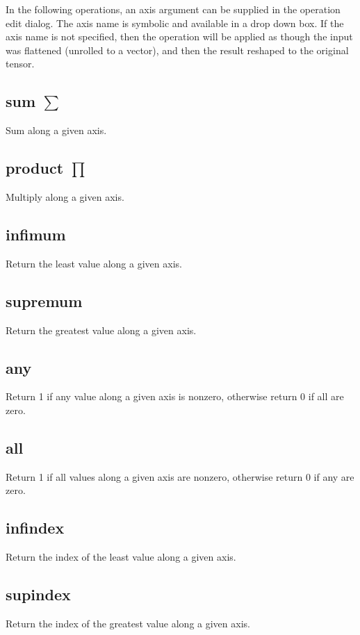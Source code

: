 In the following operations, an axis argument can be supplied in the
operation edit dialog. The axis name is symbolic and available in a
drop down box. If the axis name is not specified, then the operation
will be applied as though the input was flattened (unrolled to a
vector), and then the result reshaped to the original tensor.

\subsection{sum $\sum$}\label{Operation:sum} Sum along a given
axis.

\subsection{product $\prod$}\label{Operation:product} Multiply along a
given axis.

\subsection{infimum}\label{Operation:infimum} Return the least value
along a given axis.

\subsection{supremum}\label{Operation:supremum} Return the greatest value
along a given axis.

\subsection{any}\label{Operation:any} Return 1 if any value
along a given axis is nonzero, otherwise return 0 if all are zero.

\subsection{all}\label{Operation:all} Return 1 if all values
along a given axis are nonzero, otherwise return 0 if any are zero.

\subsection{infindex}\label{Operation:infIndex} Return the index of
the least value along a given axis.

\subsection{supindex}\label{Operation:supIndex} Return the index of
the greatest value along a given axis.


